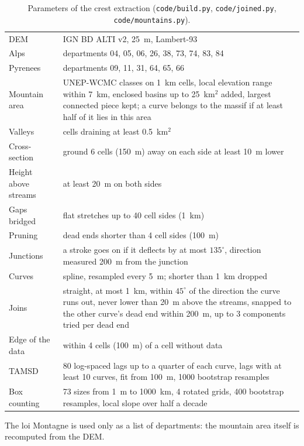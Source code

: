 \documentclass[11pt,a4paper]{article}
\newcommand{\code}[1]{\texttt{#1}}
\begin{document}
\begin{table}[h]
\centering
\caption{Parameters of the crest extraction (\code{code/build.py},
\code{code/joined.py}, \code{code/mountains.py}).}
\begin{tabularx}{\textwidth}{lX}
\toprule
DEM & IGN BD ALTI v2, 25~m, Lambert-93 \\
Alps & departments 04, 05, 06, 26, 38, 73, 74, 83, 84 \\
Pyrenees & departments 09, 11, 31, 64, 65, 66 \\
Mountain area & UNEP-WCMC classes \citep{kapos2000} on 1~km cells, local
  elevation range within 7~km, enclosed basins up to 25~km$^2$ added, largest
  connected piece kept; a curve belongs to the massif if at least half of it
  lies in this area \\
Valleys & cells draining at least 0.5~km$^2$ \\
Cross-section & ground 6 cells (150~m) away on each side at least 10~m lower \\
Height above streams & at least 20~m on both sides \\
Gaps bridged & flat stretches up to 40 cell sides (1~km) \\
Pruning & dead ends shorter than 4 cell sides (100~m) \\
Junctions & a stroke goes on if it deflects by at most $135^\circ$, direction
  measured 200~m from the junction \\
Curves & spline, resampled every 5~m; shorter than 1~km dropped \\
Joins & straight, at most 1~km, within $45^\circ$ of the direction the curve
  runs out, never lower than 20~m above the streams, snapped to the other
  curve's dead end within 200~m, up to 3 components tried per dead end \\
Edge of the data & within 4 cells (100~m) of a cell without data \\
TAMSD & 80 log-spaced lags up to a quarter of each curve, lags with at least
  10 curves, fit from 100~m, 1000 bootstrap resamples \\
Box counting & 73 sizes from 1~m to 1000~km, 4 rotated grids, 400 bootstrap
  resamples, local slope over half a decade \\
\bottomrule
\end{tabularx}
\end{table}

The loi Montagne is used only as a list of departments: the mountain area
itself is recomputed from the DEM.
\end{document}
